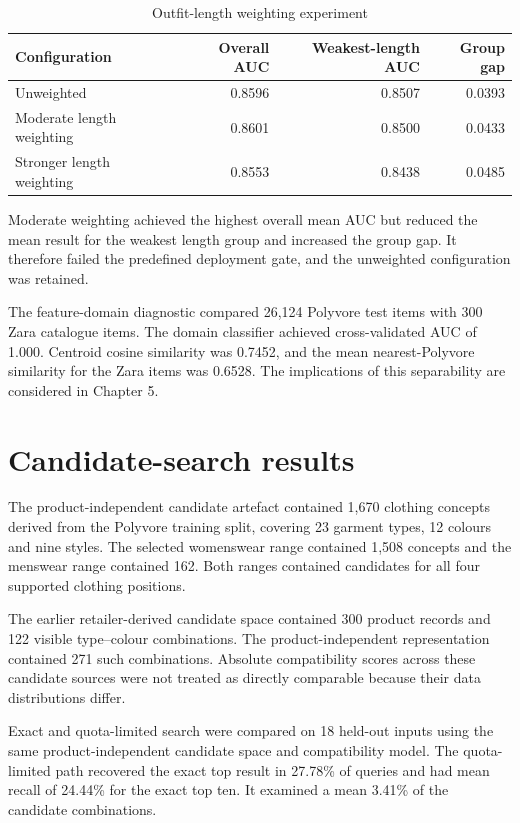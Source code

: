 \begin{table}[htbp]
  \centering
  \caption{Outfit-length weighting experiment}
  \label{tab:length-weighting-results}
  \begin{tabularx}{\textwidth}{>{\raggedright\arraybackslash}Xrrr}
    \toprule
    Configuration & Overall AUC & Weakest-length AUC & Group gap \\
    \midrule
    Unweighted & 0.8596 & 0.8507 & 0.0393 \\
    Moderate length weighting & 0.8601 & 0.8500 & 0.0433 \\
    Stronger length weighting & 0.8553 & 0.8438 & 0.0485 \\
    \bottomrule
  \end{tabularx}
\end{table}

Moderate weighting achieved the highest overall mean AUC but reduced the mean
result for the weakest length group and increased the group gap. It therefore
failed the predefined deployment gate, and the unweighted configuration was
retained.

The feature-domain diagnostic compared 26,124 Polyvore test items with 300 Zara
catalogue items. The domain classifier achieved cross-validated AUC of 1.000.
Centroid cosine similarity was 0.7452, and the mean nearest-Polyvore similarity
for the Zara items was 0.6528. The implications of this separability are
considered in Chapter 5.

\section{Candidate-search results}

The product-independent candidate artefact contained 1,670 clothing concepts
derived from the Polyvore training split, covering 23 garment types, 12 colours
and nine styles. The selected womenswear range contained 1,508 concepts and the
menswear range contained 162. Both ranges contained candidates for all four
supported clothing positions.

The earlier retailer-derived candidate space contained 300 product records and
122 visible type--colour combinations. The product-independent representation
contained 271 such combinations. Absolute compatibility scores across these
candidate sources were not treated as directly comparable because their data
distributions differ.

Exact and quota-limited search were compared on 18 held-out inputs using the
same product-independent candidate space and compatibility model. The
quota-limited path recovered the exact top result in 27.78\% of queries and had
mean recall of 24.44\% for the exact top ten. It examined a mean 3.41\% of the
candidate combinations.

